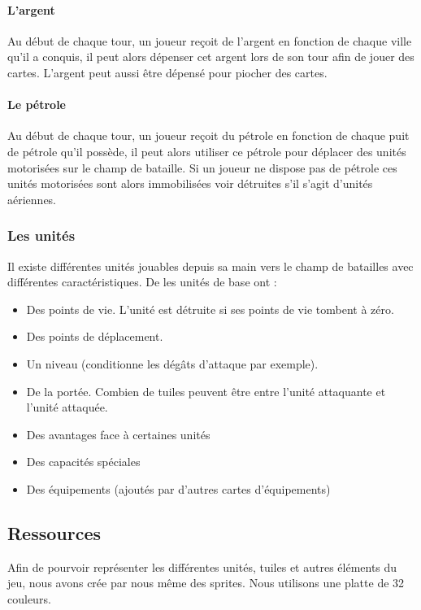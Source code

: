 \paragraph{L'argent}

Au début de chaque tour, un joueur reçoit de l'argent en fonction de chaque ville qu'il a conquis, il peut alors dépenser cet argent lors de son tour afin de jouer des cartes. L'argent peut aussi être dépensé pour piocher des cartes.

\paragraph{Le pétrole}

Au début de chaque tour, un joueur reçoit du pétrole en fonction de chaque puit de pétrole qu'il possède, il peut alors utiliser ce pétrole pour déplacer des unités motorisées sur le champ de bataille. Si un joueur ne dispose pas de pétrole ces unités motorisées sont alors immobilisées voir détruites s'il s'agit d'unités aériennes.


\subsubsection{Les unités}
Il existe différentes unités jouables depuis sa main vers le champ de batailles avec différentes caractéristiques.\n 
De les unités de base ont : 
\begin{itemize}
    \item Des points de vie. L'unité est détruite si ses points de vie tombent à zéro.
    \item Des points de déplacement.
    \item Un niveau (conditionne les dégâts d'attaque par exemple).
    \item De la portée. Combien de tuiles peuvent être entre l'unité attaquante et l'unité attaquée.
    \item Des avantages face à certaines unités
    \item Des capacités spéciales
    \item Des équipements (ajoutés par d'autres cartes d'équipements)
\end{itemize}


\newpage
\subsection{Ressources}

Afin de pourvoir représenter les différentes unités, tuiles et autres éléments du jeu, nous avons crée par nous même des sprites. Nous utilisons une platte de 32 couleurs.

